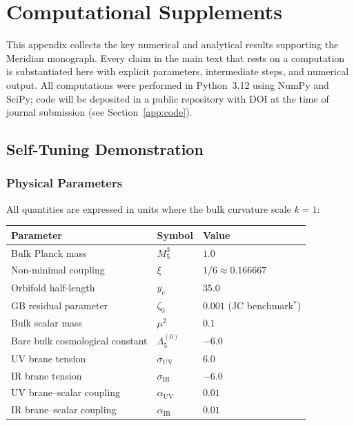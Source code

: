 
\chapter{Computational Supplements}
\label{app:computations}

This appendix collects the key numerical and analytical results supporting the Meridian monograph. Every claim in the main text that rests on a computation is substantiated here with explicit parameters, intermediate steps, and numerical output. All computations were performed in Python~3.12 using NumPy and SciPy; code will be deposited in a public repository with DOI at the time of journal submission (see Section~\ref{app:code}).


\section{Self-Tuning Demonstration}
\label{app:selftuning}

\subsection{Physical Parameters}

All quantities are expressed in units where the bulk curvature scale $k = 1$:
\begin{center}
\begin{tabular}{l l l}
\hline
Parameter & Symbol & Value \\
\hline
Bulk Planck mass & $M_5^3$ & $1.0$ \\
Non-minimal coupling & $\xi$ & $1/6 \approx 0.166667$ \\
Orbifold half-length & $y_c$ & $35.0$ \\
GB residual parameter & $\zeta_0$ & $0.001$ (JC benchmark${}^*$) \\
Bulk scalar mass & $\mu^2$ & $0.1$ \\
Bare bulk cosmological constant & $\Lambda_5^{(0)}$ & $-6.0$ \\
UV brane tension & $\sigma_{\mathrm{UV}}$ & $6.0$ \\
IR brane tension & $\sigma_{\mathrm{IR}}$ & $-6.0$ \\
UV brane--scalar coupling & $\alpha_{\mathrm{UV}}$ & $0.01$ \\
IR brane--scalar coupling & $\alpha_{\mathrm{IR}}$ & $0.01$ \\
\hline
\end{tabular}
\end{center}


